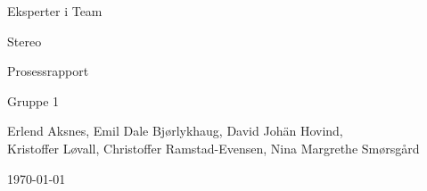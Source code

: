 \begin{titlepage}
\begin{center}
\vspace*{1in}
{\LARGE Eksperter i Team}
\par
\vspace{1cm}


\begin{figure}[ht!]
\centering
\label{overflow}
\end{figure}


{\LARGE Stereo}
\par
\vspace{0.6in}
{\LARGE Prosessrapport}
\par
\vspace{0.2in}
{\Large Gruppe 1}
\par
\vfill
\par
\vspace{0.5in}
Erlend Aksnes, Emil Dale Bjørlykhaug, David Johän Hovind, \\Kristoffer Løvall, Christoffer Ramstad-Evensen, Nina Margrethe Smørsgård
\par
\vspace{0.4cm}
\today
\end{center}
\end{titlepage}

